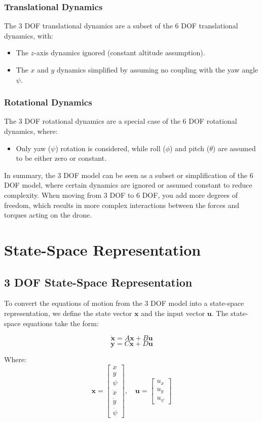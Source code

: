 \documentclass[a4paper,12pt]{report}
\begin{document}
\subsection{Translational Dynamics}
The 3 DOF translational dynamics are a subset of the 6 DOF translational dynamics, with:
\begin{itemize}
    \item The \(z\)-axis dynamics ignored (constant altitude assumption).
    \item The \(x\) and \(y\) dynamics simplified by assuming no coupling with the yaw angle \(\psi\).
\end{itemize}

\subsection{Rotational Dynamics}
The 3 DOF rotational dynamics are a special case of the 6 DOF rotational dynamics, where:
\begin{itemize}
    \item Only yaw (\(\psi\)) rotation is considered, while roll (\(\phi\)) and pitch (\(\theta\)) are assumed to be either zero or constant.
\end{itemize}

In summary, the 3 DOF model can be seen as a subset or simplification of the 6 DOF model, where certain dynamics are ignored or assumed constant to reduce complexity. When moving from 3 DOF to 6 DOF, you add more degrees of freedom, which results in more complex interactions between the forces and torques acting on the drone.

\chapter{State-Space Representation}

\section{3 DOF State-Space Representation}
To convert the equations of motion from the 3 DOF model into a state-space representation, we define the state vector \(\mathbf{x}\) and the input vector \(\mathbf{u}\). The state-space equations take the form:

\[
    \dot{\mathbf{x}} = A\mathbf{x} + B\mathbf{u}
\]
\[
    \mathbf{y} = C\mathbf{x} + D\mathbf{u}
\]

Where:
\[
    \mathbf{x} = \begin{bmatrix} x \\ y \\ \psi \\ \dot{x} \\ \dot{y} \\ \dot{\psi} \end{bmatrix}, \quad \mathbf{u} = \begin{bmatrix} u_x \\ u_y \\ u_\psi \end{bmatrix}
\]
\end{document}
